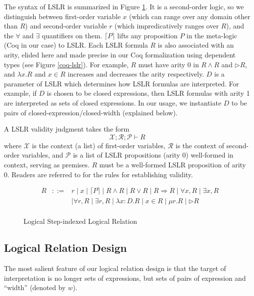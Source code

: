 \documentclass[preprint]{sigplanconf}
\newcommand{\later}{\triangleright}
\begin{document}
The syntax of LSLR is summarized in Figure \ref{lslr}. It is a second-order logic, so we distinguish between first-order variable $x$ (which can range over any domain other than $R$) and second-order variable $r$ (which impredicatively ranges over $R$), and the $\forall$ and $\exists$ quantifiers on them. $\lceil P \rceil$ lifts any proposition $P$ in the meta-logic (Coq in our case) to LSLR. Each LSLR formula $R$ is also associated with an arity, elided here and made precise in our Coq formalization using dependent types (see Figure \ref{coq-lslr}). For example, $R$ must have arity 0 in $R \wedge R$ and $\later R$, and $\lambda x.R$ and $x\in R$ increases and decreases the arity respectively. $D$ is a parameter of LSLR which determines how LSLR formulas are interpreted. For example, if $D$ is chosen to be closed expressions, then LSLR formulas with arity 1 are interpreted as sets of closed expressions. In our usage, we instantiate $D$ to be pairs of closed-expression/closed-width (explained below).

A LSLR validity judgment takes the form
$$
\mathcal{X};\mathcal{R};\mathcal{P}\vdash R
$$
where $\mathcal{X}$ is the context (a list) of first-order variables, $\mathcal{R}$ is the context of second-order variables, and $\mathcal{P}$ is a list of LSLR propositions (arity 0) well-formed in context, serving as premises. $R$ must be a well-formed LSLR proposition of arity 0. Readers are referred to \cite{dreyer2009logical} for the rules for establishing validity.

\begin{figure}
  $$\begin{array}{rrcl}
    & R &::=& r \mid x \mid \lceil P \rceil \mid R \wedge R \mid R \vee R \mid R \Rightarrow R \mid \forall x,R \mid \exists x,R \\
    & & & \mid \forall r,R \mid \exists r,R \mid \lambda x:D.R \mid x\in R \mid \mu r. R \mid \later R \\
  \end{array}$$
  \caption{\label{lslr}Logical Step-indexed Logical Relation}
\end{figure}

\subsection {Logical Relation Design}

The most salient feature of our logical relation design is that the target of interpretation is no longer sets of expressions, but sets of pairs of expression and ``width'' (denoted by $w$).
\end{document}
